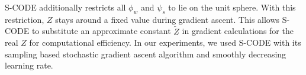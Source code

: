 S-CODE \cite{maron2010sphere} additionally restricts all $\phi_w$ and
$\psi_s$ to lie on the unit sphere.  With this restriction, $Z$ stays
around a fixed value during gradient ascent.  This allows S-CODE to
substitute an approximate constant $\tilde{Z}$ in gradient
calculations for the real $Z$ for computational efficiency.  In our
experiments, we used S-CODE with its sampling based stochastic
gradient ascent algorithm and smoothly decreasing learning rate.






